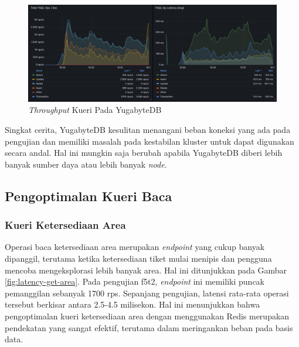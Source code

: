 \begin{figure}[htbp]
    \centering
    \includegraphics[width=1\textwidth]{resources/chapter-4/yugabyte-ops.png}
    \caption{\textit{Throughput} Kueri Pada YugabyteDB}
    \label{fig:yugabytedb-throughput}
\end{figure}

Singkat cerita, YugabyteDB kesulitan menangani beban koneksi yang ada pada pengujian dan memiliki masalah pada kestabilan kluster untuk dapat digunakan secara andal. Hal ini mungkin saja berubah apabila YugabyteDB diberi lebih banyak sumber daya atau lebih banyak \textit{node}.

\subsection{Pengoptimalan Kueri Baca}

\subsubsection{Kueri Ketersediaan Area}

Operasi baca ketersediaan area merupakan \textit{endpoint} yang cukup banyak dipanggil, terutama ketika ketersediaan tiket mulai menipis dan pengguna mencoba mengeksplorasi lebih banyak area. Hal ini ditunjukkan pada Gambar \ref{fig:latency-get-area}. Pada pengujian f5t2, \textit{endpoint} ini memiliki puncak pemanggilan sebanyak 1700 rps. Sepanjang pengujian, latensi rata-rata operasi tersebut berkisar antara 2.5-4.5 milisekon. Hal ini menunjukkan bahwa pengoptimalan kueri ketersediaan area dengan menggunakan Redis merupakan pendekatan yang sangat efektif, terutama dalam meringankan beban pada basis data.

